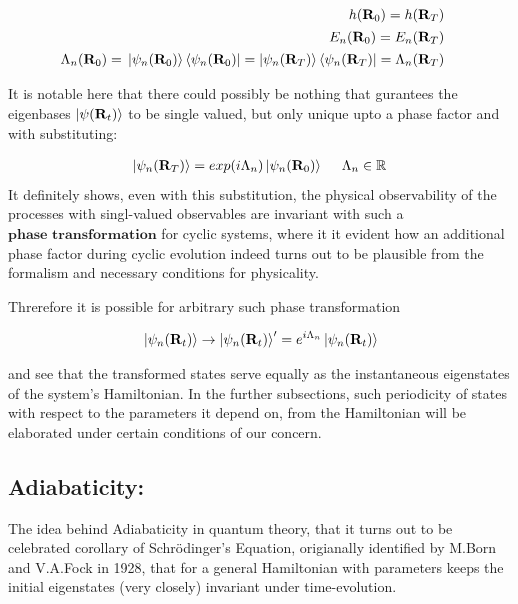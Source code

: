 \documentclass[8pt, twocoloumn]{article}
\begin{document}
\begin{align}
\begin{split}
h(\textbf{R}_0)= {}& h(\textbf{R}_T) \notag 
\end{split}\\ 
\begin{split}
 E_n(\textbf{R}_0)= {}& E_n(\textbf{R}_T) \notag 
\end{split} \\
\begin{split}
\Lambda_n(\textbf{R}_0) ={}& \ket{\psi_n(\textbf{R}_0)}\bra{\psi_n(\textbf{R}_0)}  = \ket{\psi_n(\textbf{R}_T)}\bra{\psi_n(\textbf{R}_T)}  = \Lambda_n(\textbf{R}_T) 
\end{split}
\end{align}

It is notable here that there could possibly be nothing that gurantees the eigenbases $\ket{\psi(\textbf{R}_t)}$ to be single valued, but only unique upto a phase factor and with substituting:

\begin{align}
\ket{\psi_n(\textbf{R}_T)}=exp(i\Lambda_n)\ket{\psi_n(\textbf{R}_0)} \ \ \ \ \Lambda_n \in \mathbb{R}
\end{align}
It definitely shows, even with this substitution, the physical observability of the processes with singl-valued observables are invariant with such a $\textbf{phase transformation}$ for cyclic systems, where it it evident how an additional phase factor during cyclic evolution indeed turns out to be plausible from the formalism and necessary conditions for physicality. 

Threrefore it is possible for arbitrary such phase transformation 

\begin{align} {\label{gau}}
\ket{\psi_n(\textbf{R}_t)} \to \ket{\psi_n(\textbf{R}_t)}'=e^{i\Lambda_n}\ket{\psi_n(\textbf{R}_t)}
\end{align}

and see that the transformed states serve equally as the instantaneous eigenstates of the system's Hamiltonian. 
In the further subsections, such periodicity of states with respect to the parameters it depend on, from the Hamiltonian will be elaborated under certain conditions of our concern.
\subsection{Adiabaticity: }
The idea behind Adiabaticity in quantum theory, that it turns out to be celebrated corollary of Schrödinger's Equation, origianally identified by M.Born and V.A.Fock in 1928, that for a general Hamiltonian with parameters keeps the initial eigenstates (very closely) invariant under time-evolution.  
\end{document}
